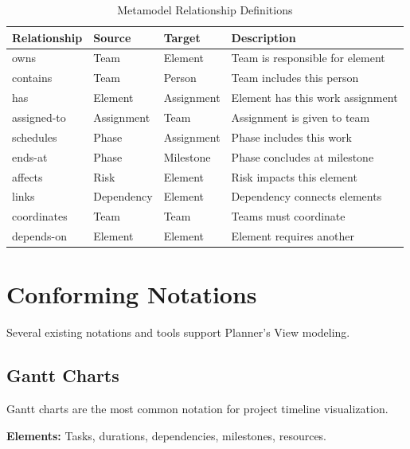 \documentclass[11pt,letterpaper]{article}
\begin{document}
\begin{table}[H]
\centering
\caption{Metamodel Relationship Definitions}
\small
\begin{tabular}{@{}L{2.3cm}L{1.8cm}L{1.8cm}L{7.5cm}@{}}
\toprule
\textbf{Relationship} & \textbf{Source} & \textbf{Target} & \textbf{Description} \\
\midrule
owns & Team & Element & Team is responsible for element \\
\addlinespace
contains & Team & Person & Team includes this person \\
\addlinespace
has & Element & Assignment & Element has this work assignment \\
\addlinespace
assigned-to & Assignment & Team & Assignment is given to team \\
\addlinespace
schedules & Phase & Assignment & Phase includes this work \\
\addlinespace
ends-at & Phase & Milestone & Phase concludes at milestone \\
\addlinespace
affects & Risk & Element & Risk impacts this element \\
\addlinespace
links & Depen\-dency & Element & Dependency connects elements \\
\addlinespace
coordinates & Team & Team & Teams must coordinate \\
\addlinespace
depends-on & Element & Element & Element requires another \\
\bottomrule
\end{tabular}
\end{table}

\section{Conforming Notations}

Several existing notations and tools support Planner's View modeling.

\subsection{Gantt Charts}

Gantt charts are the most common notation for project timeline visualization.

\textbf{Elements:} Tasks, durations, dependencies, milestones, resources.
\end{document}
